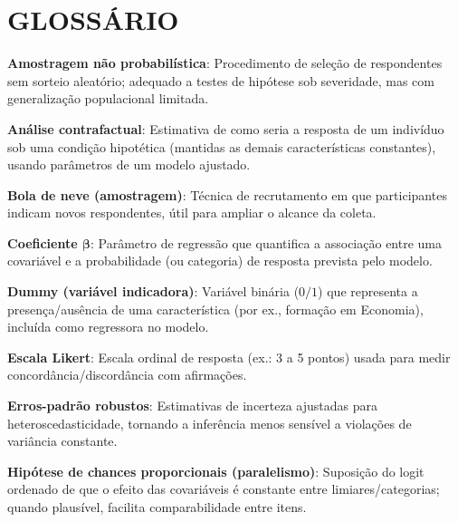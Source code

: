 






\chapter*{GLOSSÁRIO}

{ \setlength{\parindent}{0pt} %

\textbf{Amostragem não probabilística}: Procedimento de seleção de respondentes sem sorteio aleatório; adequado a testes de hipótese sob severidade, mas com generalização populacional limitada. 

\textbf{Análise contrafactual}: Estimativa de como seria a resposta de um indivíduo sob uma condição hipotética (mantidas as demais características constantes), usando parâmetros de um modelo ajustado.

\textbf{Bola de neve (amostragem)}: Técnica de recrutamento em que participantes indicam novos respondentes, útil para ampliar o alcance da coleta.

\textbf{Coeficiente $\boldsymbol\beta$}: Parâmetro de regressão que quantifica a associação entre uma covariável e a probabilidade (ou categoria) de resposta prevista pelo modelo.

\textbf{Dummy (variável indicadora)}: Variável binária ($0/1$) que representa a presença/ausência de uma característica (por ex., formação em Economia), incluída como regressora no modelo.

\textbf{Escala Likert}: Escala ordinal de resposta (ex.: 3 a 5 pontos) usada para medir concordância/discordância com afirmações.

\textbf{Erros-padrão robustos}: Estimativas de incerteza ajustadas para heteroscedasticidade, tornando a inferência menos sensível a violações de variância constante.

\textbf{Hipótese de chances proporcionais (paralelismo)}: Suposição do logit ordenado de que o efeito das covariáveis é constante entre limiares/categorias; quando plausível, facilita comparabilidade entre itens.

}
